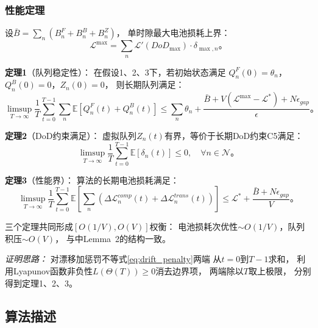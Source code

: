 \documentclass[a4paper,11pt]{article}
\begin{document}
\subsubsection{性能定理}

设$\bar{B} = \sum_n(B^F_n + B^B_n + B^Z_n)$，
单时隙最大电池损耗上界：
\begin{equation}
\mathcal{L}^{\max} = \sum_n
\mathcal{L}'(DoD_{\max}) \cdot \delta_{\max,n}。
\label{eq:L_max}
\end{equation}

\textbf{定理1}（队列稳定性）：
在假设1、2、3下，若初始状态满足
$Q^F_n(0) = \theta_n$，$Q^B_n(0) = 0$，$Z_n(0) = 0$，
则长期队列满足：
\begin{equation}
\limsup_{T\to\infty}\frac{1}{T}\sum_{t=0}^{T-1}
\sum_n\mathbb{E}\left[Q^F_n(t) + Q^B_n(t)\right]
\leq \sum_n\theta_n
+ \frac{\bar{B} + V(\mathcal{L}^{\max} - \mathcal{L}^*)
+ N\epsilon_{gap}}{\epsilon}。
\label{eq:thm1}
\end{equation}

\textbf{定理2}（DoD约束满足）：
虚拟队列$Z_n(t)$有界，等价于长期DoD约束C5满足：
\begin{equation}
\limsup_{T\to\infty}\frac{1}{T}\sum_{t=0}^{T-1}
\mathbb{E}[\delta_n(t)] \leq 0,
\quad \forall n \in \mathcal{N}。
\label{eq:thm2}
\end{equation}

\textbf{定理3}（性能界）：
算法的长期电池损耗满足：
\begin{equation}
\limsup_{T\to\infty}\frac{1}{T}\sum_{t=0}^{T-1}
\mathbb{E}\left[\sum_n(\Delta\mathcal{L}^{comp}_n(t)
+ \Delta\mathcal{L}^{trans}_n(t))\right]
\leq \mathcal{L}^* + \frac{\bar{B} + N\epsilon_{gap}}{V}。
\label{eq:thm3}
\end{equation}

三个定理共同形成$[O(1/V), O(V)]$权衡：
电池损耗次优性$\sim O(1/V)$，队列积压$\sim O(V)$，
与\cite{zhang2024mhspo}中Lemma~2的结构一致。

\textit{证明思路：}
对漂移加惩罚不等式\eqref{eq:drift_penalty}两端
从$t=0$到$T-1$求和，
利用Lyapunov函数非负性$L(\Theta(T)) \geq 0$消去边界项，
两端除以$T$取上极限，
分别得到定理1、2、3。

\subsection{算法描述}
\end{document}
